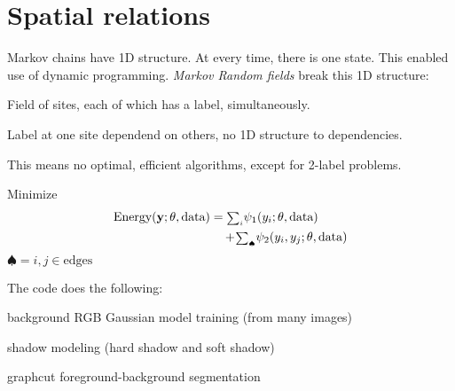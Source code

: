 \section{Spatial relations}
\begin{compactdesc}
\item[\lp{Markov Random Fields}] Markov chains have 1D structure. At every time, there is one state. This enabled use of dynamic programming. \emph{Markov Random fields} break this 1D structure:
		\begin{inparaitem}
			\item Field of sites, each of which has a label, simultaneously.
			\item Label at one site dependend on others, no 1D structure to dependencies. 
			\item This means no optimal, efficient algorithms, except for 2-label problems.
		\end{inparaitem}
	Minimize
	\begin{align*}
		\text{Energy}(\boldsymbol{\mathrm{y}};\theta,\text{data})&={\scriptstyle\sum_{i}^{}}\psi_1(y_i;\theta,\text{data})\\
		&\quad+\!{\scriptstyle\sum_{\spadesuit}^{}}\psi_2(y_i,y_j;\theta,\text{data})
	\end{align*}
	$\spadesuit=i,j\in\text{edges}$
\item[\lp{FG-BG segmentation}] The code does the following:
	\begin{inparaitem}
		\item background RGB Gaussian model training (from many images)
		\item shadow modeling (hard shadow and soft shadow)
		\item graphcut foreground-background segmentation
	\end{inparaitem}
\end{compactdesc}
